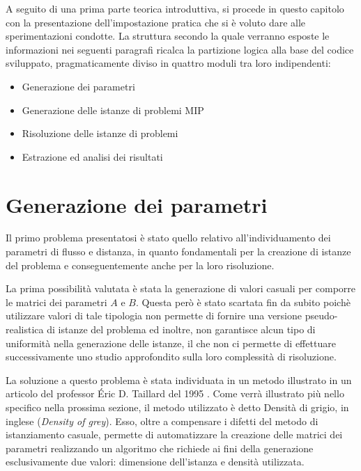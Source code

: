 A seguito di una prima parte teorica introduttiva, si procede in questo capitolo con la presentazione 
dell'impostazione pratica che si è voluto dare alle sperimentazioni condotte. La struttura secondo la quale verranno esposte 
le informazioni nei seguenti paragrafi ricalca la partizione logica alla base del codice sviluppato, pragmaticamente diviso 
in quattro moduli tra loro indipendenti:
\begin{itemize}
    \item Generazione dei parametri
    \item Generazione delle istanze di problemi MIP
    \item Risoluzione delle istanze di problemi
    \item Estrazione ed analisi dei risultati
\end{itemize}




\section{Generazione dei parametri}
\label{sec:pargen}
Il primo problema presentatosi è stato quello relativo all'individuamento dei parametri di flusso e distanza, in quanto 
fondamentali per la creazione di istanze del problema e conseguentemente anche per la loro risoluzione.

La prima possibilità valutata è stata la generazione di valori casuali per comporre le matrici dei parametri $A$ e $B$. 
Questa però è stato scartata fin da subito poichè utilizzare valori di tale tipologia non permette di fornire una versione 
pseudo-realistica di istanze del problema ed inoltre, non garantisce alcun tipo di uniformità nella generazione delle istanze, 
il che non ci permette di effettuare successivamente uno studio approfondito sulla loro complessità di risoluzione.

La soluzione a questo problema è stata individuata in un metodo illustrato in un articolo del professor Éric D. Taillard del 1995
\cite{TAILLARD}. Come verrà illustrato più nello specifico nella prossima sezione, il metodo utilizzato è detto Densità di
grigio, in inglese (\textit{Density of grey}). Esso, oltre a compensare i difetti del metodo di istanziamento casuale, permette
di automatizzare la creazione delle matrici dei parametri realizzando un algoritmo che richiede ai fini della generazione 
esclusivamente due valori: dimensione dell'istanza e densità utilizzata.

